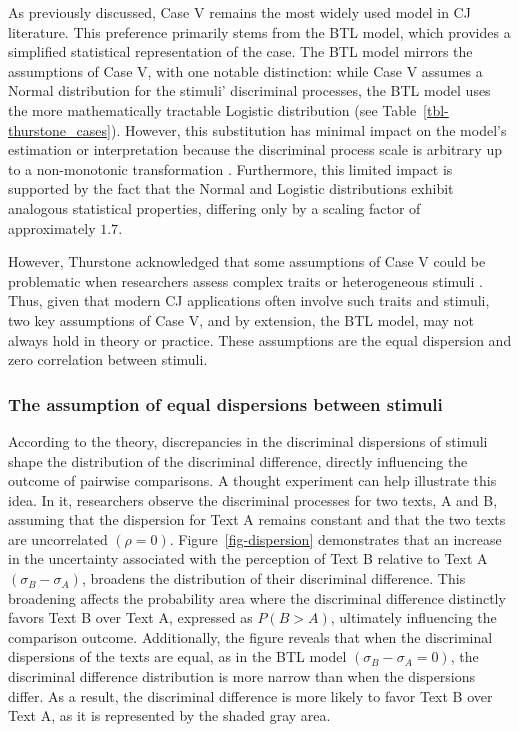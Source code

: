 \documentclass[
  authoryear,
  review,
  1p]{elsarticle}
\begin{document}
As previously discussed, Case V remains the most widely used model in CJ
literature. This preference primarily stems from the BTL model, which
provides a simplified statistical representation of the case. The BTL
model mirrors the assumptions of Case V, with one notable distinction:
while Case V assumes a Normal distribution for the stimuli' discriminal
processes, the BTL model uses the more mathematically tractable Logistic
distribution \citep{Andrich_1978, Bramley_2008} (see
Table~\ref{tbl-thurstone_cases}). However, this substitution has minimal
impact on the model's estimation or interpretation because the
discriminal process scale is arbitrary up to a non-monotonic
transformation \citep{vanderLinden_et_al_2017_I, McElreath_2021}.
Furthermore, this limited impact is supported by the fact that the
Normal and Logistic distributions exhibit analogous statistical
properties, differing only by a scaling factor of approximately \(1.7\).

However, Thurstone acknowledged that some assumptions of Case V could be
problematic when researchers assess complex traits or heterogeneous
stimuli \citep{Thurstone_1927a}. Thus, given that modern CJ applications
often involve such traits and stimuli, two key assumptions of Case V,
and by extension, the BTL model, may not always hold in theory or
practice. These assumptions are the equal dispersion and zero
correlation between stimuli.

\subsubsection{The assumption of equal dispersions between
stimuli}\label{sec-theory-issue1a}

According to the theory, discrepancies in the discriminal dispersions of
stimuli shape the distribution of the discriminal difference, directly
influencing the outcome of pairwise comparisons. A thought experiment
can help illustrate this idea. In it, researchers observe the
discriminal processes for two texts, A and B, assuming that the
dispersion for Text A remains constant and that the two texts are
uncorrelated \((\rho=0)\). Figure~\ref{fig-dispersion} demonstrates that
an increase in the uncertainty associated with the perception of Text B
relative to Text A \((\sigma_{B} - \sigma_{A})\), broadens the
distribution of their discriminal difference. This broadening affects
the probability area where the discriminal difference distinctly favors
Text B over Text A, expressed as \(P(B>A)\), ultimately influencing the
comparison outcome. Additionally, the figure reveals that when the
discriminal dispersions of the texts are equal, as in the BTL model
\((\sigma_{B} - \sigma_{A}=0)\), the discriminal difference distribution
is more narrow than when the dispersions differ. As a result, the
discriminal difference is more likely to favor Text B over Text A, as it
is represented by the shaded gray area.
\end{document}

